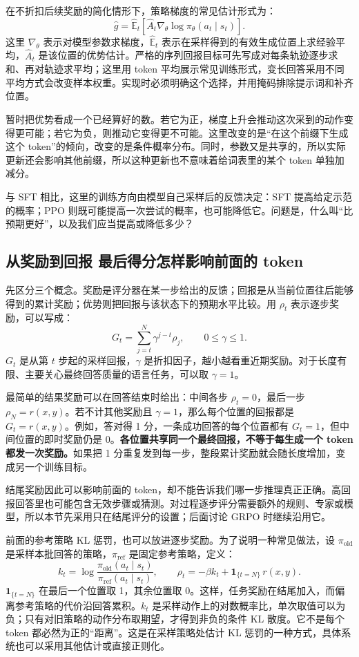 在不折扣后续奖励的简化情形下，策略梯度的常见估计形式为：
\[
    \widehat g
    =\widehat{\mathbb E}_{t}
    \left[\widehat A_t\nabla_\theta
    \log\pi_\theta(a_t\mid s_t)\right].
\]
这里 $\nabla_\theta$ 表示对模型参数求梯度，$\widehat{\mathbb E}_t$ 表示在采样得到的有效生成位置上求经验平均，$\widehat A_t$ 是该位置的优势估计。严格的序列回报目标可先写成对每条轨迹逐步求和、再对轨迹求平均；这里用 token 平均展示常见训练形式，变长回答采用不同平均方式会改变样本权重。实现时必须明确这个选择，并用掩码排除提示词和补齐位置。

暂时把优势看成一个已经算好的数。若它为正，梯度上升会推动这次采到的动作变得更可能；若它为负，则推动它变得更不可能。这里改变的是``在这个前缀下生成这个 token''的倾向，改变的是条件概率分布。同时，参数又是共享的，所以实际更新还会影响其他前缀，所以这种更新也不意味着给词表里的某个 token 单独加减分。

与 SFT 相比，这里的训练方向由模型自己采样后的反馈决定：SFT 提高给定示范的概率；PPO 则既可能提高一次尝试的概率，也可能降低它。问题是，什么叫``比预期更好''，以及我们应当提高或降低多少？

\subsection{从奖励到回报 最后得分怎样影响前面的 token}

先区分三个概念。奖励是评分器在某一步给出的反馈；回报是从当前位置往后能够得到的累计奖励；优势则把回报与该状态下的预期水平比较。用 $\rho_t$ 表示逐步奖励，可以写成：
\[
    G_t=\sum_{j=t}^{N}\gamma^{j-t}\rho_j,
    \qquad 0\leq\gamma\leq 1.
\]
$G_t$ 是从第 $t$ 步起的采样回报，$\gamma$ 是折扣因子，越小越看重近期奖励。对于长度有限、主要关心最终回答质量的语言任务，可以取 $\gamma=1$。

最简单的结果奖励可以在回答结束时给出：中间各步 $\rho_t=0$，最后一步 $\rho_N=r(x,y)$。若不计其他奖励且 $\gamma=1$，那么每个位置的回报都是 $G_t=r(x,y)$。例如，答对得 1 分，一条成功回答的每个位置都有 $G_t=1$，但中间位置的即时奖励仍是 0。\textbf{各位置共享同一个最终回报，不等于每生成一个 token 都发一次奖励。}如果把 1 分重复发到每一步，整段累计奖励就会随长度增加，变成另一个训练目标。

结尾奖励因此可以影响前面的 token，却不能告诉我们哪一步推理真正正确。高回报回答里也可能包含无效步骤或猜测。对过程逐步评分需要额外的规则、专家或模型，所以本节先采用只在结尾评分的设置；后面讨论 GRPO 时继续沿用它。

前面的参考策略 KL 惩罚，也可以放进逐步奖励。为了说明一种常见做法，设 $\pi_{\mathrm{old}}$ 是采样本批回答的策略，$\pi_{\mathrm{ref}}$ 是固定参考策略，定义：
\[
    k_t=\log\frac{\pi_{\mathrm{old}}(a_t\mid s_t)}
                         {\pi_{\mathrm{ref}}(a_t\mid s_t)},
    \qquad
    \rho_t=-\beta k_t+\mathbf{1}_{\{t=N\}}\,r(x,y).
\]
$\mathbf{1}_{\{t=N\}}$ 在最后一个位置取 1，其余位置取 0。这样，任务奖励在结尾加入，而偏离参考策略的代价沿回答累积。$k_t$ 是采样动作上的对数概率比，单次取值可以为负；只有对旧策略的动作分布取期望，才得到非负的条件 KL 散度。它不是每个 token 都必然为正的``距离''。这是在采样策略处估计 KL 惩罚的一种方式，具体系统也可以采用其他估计或直接正则化。

